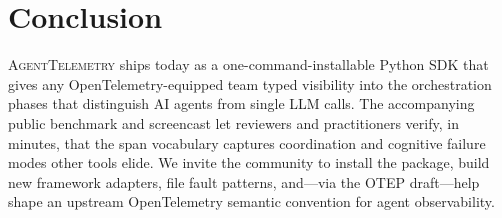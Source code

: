\documentclass[10pt,conference]{IEEEtran}
\begin{document}
\section{Conclusion}
\label{sec:conclusion}

\textsc{AgentTelemetry} ships today as a one-command-installable
Python SDK that gives any OpenTelemetry-equipped team typed
visibility into the orchestration phases that distinguish AI
agents from single LLM calls. The accompanying public benchmark
and screencast let reviewers and practitioners verify, in
minutes, that the span vocabulary captures coordination and
cognitive failure modes other tools elide. We invite the
community to install the package, build new framework adapters,
file fault patterns, and---via the OTEP draft---help shape an
upstream OpenTelemetry semantic convention for agent
observability.



\end{document}

